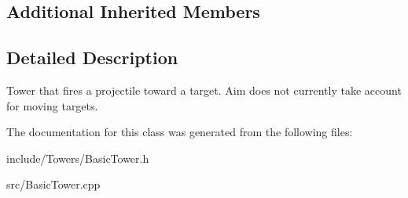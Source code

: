 \subsection*{Additional Inherited Members}


\subsection{Detailed Description}
Tower that fires a projectile toward a target. Aim does not currently take account for moving targets. 

The documentation for this class was generated from the following files\+:\begin{DoxyCompactItemize}
\item 
include/\+Towers/Basic\+Tower.\+h\item 
src/Basic\+Tower.\+cpp\end{DoxyCompactItemize}
